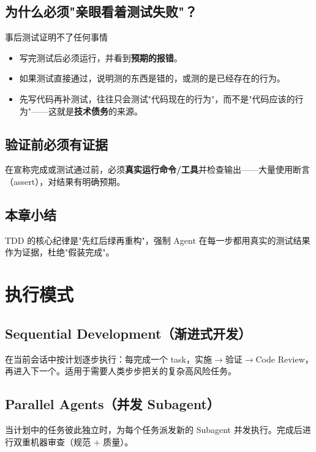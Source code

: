 \documentclass[a4paper]{article}
\begin{document}
\subsection{为什么必须"亲眼看着测试失败"？}

\begin{warningbox}{事后测试证明不了任何事情}
\begin{itemize}
    \item 写完测试后必须运行，并看到\textbf{预期的报错}。
    \item 如果测试直接通过，说明测的东西是错的，或测的是已经存在的行为。
    \item 先写代码再补测试，往往只会测试"代码现在的行为"，而不是"代码应该的行为"——这就是\textbf{技术债务}的来源。
\end{itemize}
\end{warningbox}

\subsection{验证前必须有证据}

在宣称完成或测试通过前，必须\textbf{真实运行命令/工具}并检查输出——大量使用断言（assert），对结果有明确预期。

\subsection{本章小结}

TDD 的核心纪律是"先红后绿再重构"，强制 Agent 在每一步都用真实的测试结果作为证据，杜绝"假装完成"。


\section{执行模式}

\subsection{Sequential Development（渐进式开发）}

在当前会话中按计划逐步执行：每完成一个 task，实施$\rightarrow$验证$\rightarrow$Code Review，再进入下一个。适用于需要人类步步把关的复杂高风险任务。

\subsection{Parallel Agents（并发 Subagent）}

当计划中的任务彼此独立时，为每个任务派发新的 Subagent 并发执行。完成后进行双重机器审查（规范 + 质量）。
\end{document}
